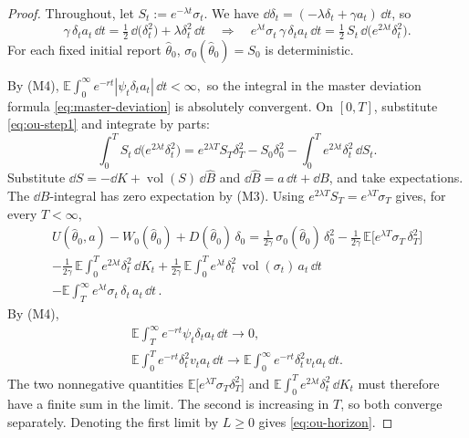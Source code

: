 \documentclass[12pt]{article}
\DeclareMathOperator{\vol}{vol}
\newcommand{\E}{\mathbb{E}}
\newcommand{\hth}{\hat\theta}
\newcommand{\hB}{\hat B}
\begin{document}
\begin{proof}
Throughout, let $S_t := e^{-\lambda t} \sigma_t$. We have
$\dd\delta_t=(-\lambda\delta_t+\gamma a_t)\,\dd t$, so 
\begin{equation}\label{eq:ou-step1}
\gamma\,\delta_ta_t\,\dd t
=\tfrac12\,\dd\big(\delta_t^2\big)+\lambda\delta_t^2\,\dd t
\quad \Rightarrow \quad
e^{\lambda t}\sigma_t\,\gamma\,\delta_ta_t\,\dd t
=\tfrac12\,S_t\,\dd\big(e^{2\lambda t}\delta_t^2\big) .
\end{equation}
For each fixed initial report $\hth_0$, $\sigma_0(\hth_0)=S_0$ is
deterministic.




By \textnormal{(M4)},
$
  \E\int_0^\infty
    e^{-rt}|\psi_t\delta_ta_t|\,\dd t<\infty,
$
so the integral in the master deviation formula \eqref{eq:master-deviation} is absolutely
convergent. On $[0,T]$, substitute
\eqref{eq:ou-step1} and integrate by parts:
\[
\int_0^T S_t\,\dd\big(e^{2\lambda t}\delta_t^2\big)
=e^{2\lambda T}S_T\delta_T^2-S_0\delta_0^2
-\int_0^T e^{2\lambda t}\delta_t^2\,\dd S_t .
\]
Substitute $\dd S=-\dd K+\vol(S)\,\dd\hB$ and
$\dd\hB=a\,\dd t+\dd B$, and take expectations. The $\dd B$-integral has
zero expectation by (M3).
Using $e^{2\lambda T}S_T=e^{\lambda T}\sigma_T$ gives, for every
$T<\infty$,
\begin{multline}\label{eq:ou-T}
U(\hth_0,a)-W_0(\hth_0)+D(\hth_0)\,\delta_0
=\frac{1}{2\gamma}\,\sigma_0(\hth_0)\,\delta_0^{2}
-\frac{1}{2\gamma}\,\E\big[e^{\lambda T}\sigma_T\,\delta_T^{2}\big]\\
-\frac{1}{2\gamma}\,\E\!\int_0^T e^{2\lambda t}\delta_t^{2}\,\dd K_t
+\frac{1}{2\gamma}\,\E\!\int_0^T e^{\lambda t}\delta_t^{2}\,
\vol(\sigma_t)\,a_t\,\dd t\\
-\E\!\int_T^\infty e^{\lambda t}\sigma_t\,\delta_t\,a_t\,\dd t\,.
\end{multline}
By \textnormal{(M4)},
\[
\begin{gathered}
  \E\int_T^\infty e^{-rt}\psi_t\delta_ta_t\,\dd t
  \longrightarrow0,\\
  \E\int_0^T e^{-rt}\delta_t^2v_ta_t\,\dd t
  \longrightarrow
  \E\int_0^\infty e^{-rt}\delta_t^2v_ta_t\,\dd t.
\end{gathered}
\]
The two nonnegative quantities
  $\E\big[e^{\lambda T}\sigma_T\delta_T^2\big]$
and
  $\E\!\int_0^T e^{2\lambda t}\delta_t^2\,\dd K_t$
must therefore have a finite sum in the limit. The second is increasing in
$T$, so both converge separately. Denoting the first limit by $L\ge0$
gives \eqref{eq:ou-horizon}.
\end{proof}
\end{document}
